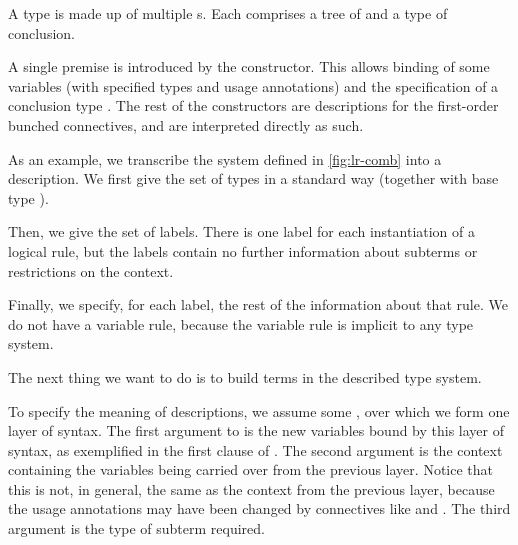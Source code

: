 A type  is made up of multiple s.
Each  comprises a tree of  and a type
of conclusion.

A single premise is introduced by the
 constructor.
This allows binding of some variables \AgdaBound{$\Delta$} (with specified
types and usage annotations) and the specification of a conclusion type
.
The rest of the constructors are descriptions for the first-order bunched
connectives, and are interpreted directly as such.


As an example, we transcribe the system defined in \cref{fig:lr-comb} into a
description.
We first give the set of types in a standard way (together with base type
\AgdaInductiveConstructor{$\iota$}).


Then, we give the set of labels.
There is one label for each instantiation of a logical rule, but the labels
contain no further information about subterms or restrictions on the context.


Finally, we specify, for each label, the rest of the information about that
rule.
We do not have a variable rule, because the variable rule is implicit to any
type system.


The next thing we want to do is to build terms in the described type system.


To specify the meaning of descriptions, we assume some
, over which we form one layer of syntax.
The first argument to  is the new variables bound by this layer
of syntax, as exemplified in the first clause of
.
The second argument is the context containing the variables being carried over
from the previous layer.
Notice that this is not, in general, the same as the context from the previous
layer, because the usage annotations may have been changed by connectives like
 and .
The third argument is the type of subterm required.

